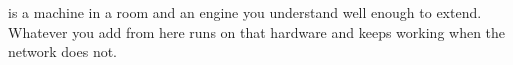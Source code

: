 
 is a machine in a room and an engine you understand
well enough to extend. Whatever you add from here runs on that hardware and keeps
working when the network does not.

